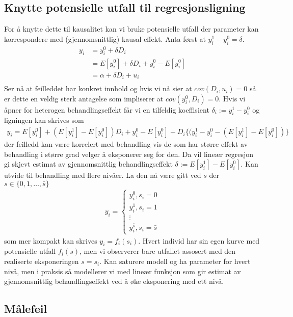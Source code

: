 \subsection{Knytte potensielle utfall til regresjonsligning}
For å knytte dette til kausalitet kan vi bruke potensielle utfall der parameter kan korrespondere med (gjennomsnittlig) kausal effekt. Anta først at $y_i^1-y_i^0 = \delta$.
\begin{align}
y_i &= y_i^0 + \delta D_i \\
&= E[y_i^0]+\delta D_i + y_i^0-E[y_i^0] \\
&= \alpha + \delta D_i + u_i \\
\end{align}
Ser nå at feilleddet har konkret innhold og hvis vi nå sier at $cov(D_i,u_i)=0$ så er dette en veldig sterk antagelse som impliserer at $cov(y_i^0,D_i) = 0$. Hvis vi åpner for heterogen behandlingseffekt får vi en tilfeldig koeffisient $\delta_i := y_i^1-y_i^0$ og ligningen kan skrives som
\begin{align}
y_i = E[y_i^0]+(E[y_i^1]-E[y_i^0])D_i + y_i^0-E[y_i^0]+ D_i\{(y_i^1-y_i^0-(E[y_i^1]-E[y_i^0])\}
\end{align}
der feilledd kan være korrelert med behandling vis de som har større effekt av behandling i større grad velger å eksponerer seg for den. Da vil lineær regresjon gi skjevt estimat av gjennomsnittlig behandlingseffekt $\delta := E[y_i^1]-E[y_i^0]$. Kan utvide til behandling med flere nivåer. La den nå være gitt ved $s$ der $s \in \{0,1,\ldots,\bar{s}\}$
\begin{align}
y_i = 
\begin{cases}
y_i^0, s_i = 0 \\
y_i^1, s_i = 1 \\
\vdots \\
y_i^{\bar{s}}, s_i = \bar{s}
\end{cases}
\end{align}
som mer kompakt kan skrives $y_i = f_i(s_i)$. Hvert individ har sin egen kurve med potensielle utfall $f_i(s)$, men vi observerer bare utfallet assosert med den realiserte eksponeringen $s=s_i$. Kan saturere modell og ha parameter for hvert nivå, men i praksis så modellerer vi med lineær funksjon som gir estimat av gjennomsnittlig behandlingseffekt ved å øke eksponering med ett nivå.
\subsection{Målefeil}
